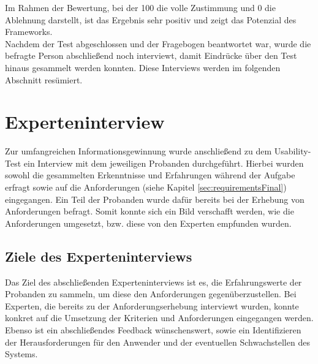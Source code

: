        Im Rahmen der Bewertung, bei der 100 die volle Zustimmung und 0 die Ablehnung darstellt, ist das Ergebnis 
        sehr positiv und zeigt das Potenzial des Frameworks. 
        \\
        Nachdem der Test abgeschlossen und der Fragebogen beantwortet war, wurde die befragte Person abschließend noch interviewt, damit 
        Eindrücke über den Test hinaus gesammelt werden konnten. Diese Interviews werden im folgenden Abschnitt resümiert. 

\section{Experteninterview}
        Zur umfangreichen Informationsgewinnung wurde anschließend zu dem Usability-Test ein Interview mit dem jeweiligen Probanden 
        durchgeführt. Hierbei wurden sowohl die gesammelten Erkenntnisse und Erfahrungen während der Aufgabe erfragt sowie auf die Anforderungen 
        (siehe Kapitel \ref{sec:requirementsFinal}) eingegangen. Ein Teil der Probanden wurde dafür bereits 
        bei der Erhebung von Anforderungen befragt. Somit konnte sich ein Bild verschafft werden, wie die Anforderungen 
        umgesetzt, bzw. diese von den Experten empfunden wurden.
    
    \subsection{Ziele des Experteninterviews}
        Das Ziel des abschließenden Experteninterviews ist es, die Erfahrungswerte der Probanden zu sammeln, um diese den Anforderungen gegenüberzustellen. Bei 
        Experten, die bereits zu der Anforderungserhebung interviewt wurden, konnte konkret auf die Umsetzung der Kriterien und Anforderungen eingegangen werden. 
        Ebenso ist ein abschließendes Feedback wünschenswert, sowie ein Identifizieren der Herausforderungen für den Anwender und der eventuellen Schwachstellen 
        des Systems. 

